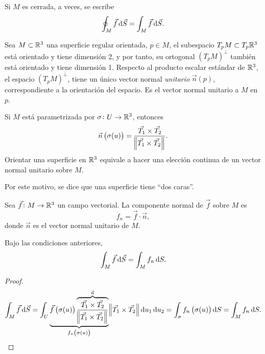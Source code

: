 \begin{obs}
    Si $M$ es cerrada, a veces, se escribe
    \[
        \oint_M \vec{f} \dif \vec{S} = \int_M \vec{f} \dif \vec{S}.
    \]
\end{obs}

\begin{defi}
    Sea $M \subset \mathbb{R}^3$ una superficie regular orientada, $p \in M$, el subespacio $T_pM \subset T_p\mathbb{R}^3$ está orientado y tiene
    dimensión 2, y por tanto, su ortogonal $\left( T_pM \right)^\perp$ tambi\'en está orientado y tiene dimensión 1. Respecto al producto
    escalar estándar de $\mathbb{R}^3$, el espacio $\left( T_pM \right)^\perp$, tiene un único vector normal \emph{unitario} $\vec{n}(p)$, 
    correspondiente a la orientación del espacio. Es el vector normal unitario a $M$ en $p$.
\end{defi}

\begin{obs}
    Si $M$ está parametrizada por $\sigma \colon U \to \mathbb{R}^3$, entonces
    \[
        \vec{n} \left( \sigma(u) \right) = \frac{\vec{T_1} \times \vec{T_2}}{\norm{\vec{T_1} \times \vec{T_2}}}.
    \]
    Orientar una superficie en $\mathbb{R}^3$ equivale a hacer una elección continua de un vector normal unitario sobre $M$.

    Por este motivo, se dice que una superficie tiene ``dos caras''.
\end{obs}

\begin{defi}
    Sea $\vec{f} \colon M \to \mathbb{R}^3$ un campo vectorial. La componente normal de $\vec{f}$ sobre $M$ es 
    \[
        f_n = \vec{f} \cdot \vec{n},
    \]
    donde $\vec{n}$ es el vector normal unitario de $M$.
\end{defi}

\begin{prop}
    Bajo las condiciones anteriores,
    \[
        \int_M \vec{f} \dif \vec{S} = \int_M f_n \dif S.
    \]
\end{prop}

\begin{proof}
    \[
        \int_M \vec{f} \dif \vec{S} = \int_U \underbrace{\vec{f}\left( \sigma(u) \right) \overbrace{\frac{\vec{T_1} \times \vec{T_2}}{\norm{\vec{T_1} \times \vec{T_2}}}}^
        {\vec{n}}}_{f_n\left( \sigma(u) \right)} \norm{\vec{T_1} \times \vec{T_2}} \dif u_1 \dif u_2 = \int_\sigma f_n\left( \sigma(u) \right) \dif S =
        \int_M f_n \dif S.
    \]
\end{proof}

